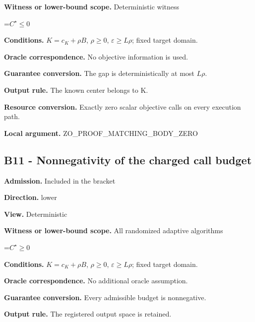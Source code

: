 \documentclass[10pt,a4paper]{article}
\newcommand{\AtlasMath}[1]{\par\begingroup\centering\setbox0=\hbox{$\displaystyle #1$}\ifdim\wd0>1.4\linewidth\typeout{ATLAS WIDE FORMULA: \the\wd0}\fi\ifdim\wd0>\linewidth\resizebox{\linewidth}{!}{\box0}\else\box0\fi\par\endgroup}
\begin{document}
\textbf{Witness or lower-bound scope.} Deterministic witness



\AtlasMath{C^\star\le0}


\textbf{Conditions.} $K=c_K+\rho B$, $\rho \ge 0$, $\varepsilon \ge L\rho$; fixed target domain.



\textbf{Oracle correspondence.} No objective information is used.



\textbf{Guarantee conversion.} The gap is deterministically at most $L\rho$.



\textbf{Output rule.} The known center belongs to K.



\textbf{Resource conversion.} Exactly zero scalar objective calls on every execution path.



\textbf{Local argument.} ZO\_PROOF\_MATCHING\_BODY\_ZERO



\subsection{B11 - Nonnegativity of the charged call budget}


\textbf{Admission.} Included in the bracket



\textbf{Direction.} lower



\textbf{View.} Deterministic



\textbf{Witness or lower-bound scope.} All randomized adaptive algorithms



\AtlasMath{C^\star\ge0}


\textbf{Conditions.} $K=c_K+\rho B$, $\rho \ge 0$, $\varepsilon \ge L\rho$; fixed target domain.



\textbf{Oracle correspondence.} No additional oracle assumption.



\textbf{Guarantee conversion.} Every admissible budget is nonnegative.



\textbf{Output rule.} The registered output space is retained.
\end{document}
